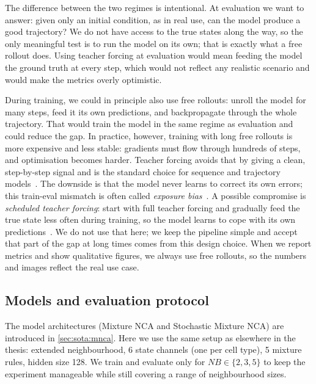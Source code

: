 The difference between the two regimes is intentional.
At evaluation we want to answer: given only an initial condition, as in real use, can the model produce a good trajectory?
We do not have access to the true states along the way, so the only meaningful test is to run the model on its own; that is exactly what a free rollout does.
Using teacher forcing at evaluation would mean feeding the model the ground truth at every step, which would not reflect any realistic scenario and would make the metrics overly optimistic.

During training, we could in principle also use free rollouts: unroll the model for many steps, feed it its own predictions, and backpropagate through the whole trajectory.
That would train the model in the same regime as evaluation and could reduce the gap.
In practice, however, training with long free rollouts is more expensive and less stable: gradients must flow through hundreds of steps, and optimisation becomes harder.
Teacher forcing avoids that by giving a clean, step-by-step signal and is the standard choice for sequence and trajectory models~\cite{goodfellow2016deep,williams1989learning}.
The downside is that the model never learns to correct its own errors; this train-eval mismatch is often called \emph{exposure bias}~\cite{exposurebias_wang2020}.
A possible compromise is \emph{scheduled teacher forcing}: start with full teacher forcing and gradually feed the true state less often during training, so the model learns to cope with its own predictions~\cite{bengio2015scheduled_sampling}.
We do not use that here; we keep the pipeline simple and accept that part of the gap at long times comes from this design choice.
When we report metrics and show qualitative figures, we always use free rollouts, so the numbers and images reflect the real use case.

\subsection{Models and evaluation protocol}
\label{sec:impl:curriculum:models}

The model architectures (Mixture NCA and Stochastic Mixture NCA) are introduced in \cref{sec:sota:mnca}.
Here we use the same setup as elsewhere in the thesis: extended neighbourhood, 6 state channels (one per cell type), 5 mixture rules, hidden size 128.
We train and evaluate only for \(NB \in \{2, 3, 5\}\) to keep the experiment manageable while still covering a range of neighbourhood sizes.

